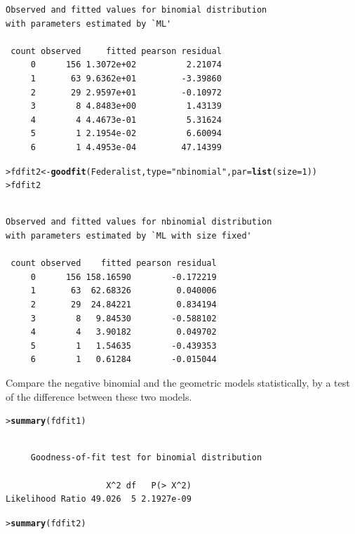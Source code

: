 \documentclass[10pt]{report}\usepackage[]{graphicx}\usepackage[]{color}
\makeatletter
\newcommand{\hlnum}[1]{\textcolor[rgb]{0.686,0.059,0.569}{#1}}%
\newcommand{\hlstr}[1]{\textcolor[rgb]{0.192,0.494,0.8}{#1}}%
\newcommand{\hlstd}[1]{\textcolor[rgb]{0.345,0.345,0.345}{#1}}%
\newcommand{\hlkwb}[1]{\textcolor[rgb]{0.69,0.353,0.396}{#1}}%
\newcommand{\hlkwc}[1]{\textcolor[rgb]{0.333,0.667,0.333}{#1}}%
\newcommand{\hlkwd}[1]{\textcolor[rgb]{0.737,0.353,0.396}{\textbf{#1}}}%
\newenvironment{kframe}{%
 \def\at@end@of@kframe{}%
 \ifinner\ifhmode%
  \def\at@end@of@kframe{\end{minipage}}%
  \begin{minipage}{\columnwidth}%
 \fi\fi%
 \def\FrameCommand##1{\hskip\@totalleftmargin \hskip-\fboxsep
 \colorbox{shadecolor}{##1}\hskip-\fboxsep
     \hskip-\linewidth \hskip-\@totalleftmargin \hskip\columnwidth}%
 \MakeFramed {\advance\hsize-\width
   \@totalleftmargin\z@ \linewidth\hsize
   \@setminipage}}%
 {\par\unskip\endMakeFramed%
 \at@end@of@kframe}
\newenvironment{knitrout}{}{} %
\renewenvironment{knitrout}{\small\renewcommand{\baselinestretch}{.85}}{} %
\makeatother
\begin{document}
\begin{Exercises}
\begin{enumerate*}
\begin{ans}
\begin{knitrout}
\begin{kframe}
\begin{verbatim}
Observed and fitted values for binomial distribution
with parameters estimated by `ML' 

 count observed     fitted pearson residual
     0      156 1.3072e+02          2.21074
     1       63 9.6362e+01         -3.39860
     2       29 2.9597e+01         -0.10972
     3        8 4.8483e+00          1.43139
     4        4 4.4673e-01          5.31624
     5        1 2.1954e-02          6.60094
     6        1 4.4953e-04         47.14399
\end{verbatim}
\begin{alltt}
\hlstd{> }\hlstd{fdfit2} \hlkwb{<-} \hlkwd{goodfit}\hlstd{(Federalist,} \hlkwc{type} \hlstd{=} \hlstr{"nbinomial"}\hlstd{,} \hlkwc{par} \hlstd{=} \hlkwd{list}\hlstd{(}\hlkwc{size}\hlstd{=}\hlnum{1}\hlstd{))}
\hlstd{> }\hlstd{fdfit2}
\end{alltt}
\begin{verbatim}

Observed and fitted values for nbinomial distribution
with parameters estimated by `ML with size fixed' 

 count observed    fitted pearson residual
     0      156 158.16590        -0.172219
     1       63  62.68326         0.040006
     2       29  24.84221         0.834194
     3        8   9.84530        -0.588102
     4        4   3.90182         0.049702
     5        1   1.54635        -0.439353
     6        1   0.61284        -0.015044
\end{verbatim}
\end{kframe}
\end{knitrout}
    \end{ans}
    
    \item Compare the negative binomial and the geometric models statistically,
    by a \LR test of the difference between these two models.
    \begin{ans}
\begin{knitrout}\footnotesize
{}\color{fgcolor}\begin{kframe}
\begin{alltt}
\hlstd{> }\hlkwd{summary}\hlstd{(fdfit1)}
\end{alltt}
\begin{verbatim}

	 Goodness-of-fit test for binomial distribution

                    X^2 df   P(> X^2)
Likelihood Ratio 49.026  5 2.1927e-09
\end{verbatim}
\begin{alltt}
\hlstd{> }\hlkwd{summary}\hlstd{(fdfit2)}
\end{alltt}
\begin{verbatim}


\end{verbatim}
\end{kframe}
\end{knitrout}
\end{ans}
\end{enumerate*}
\end{Exercises}
\end{document}
